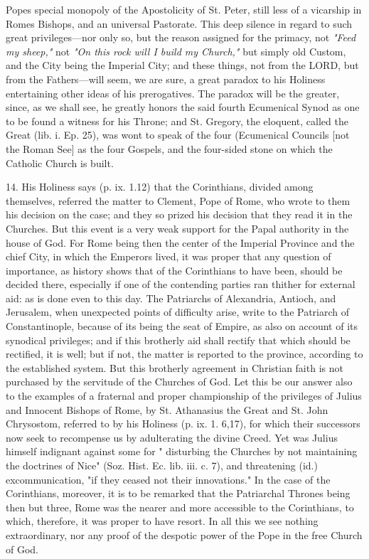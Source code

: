 Pope\textquotesingle s special monopoly of the Apostolicity of St.
Peter, still less of a vicarship in Rome\textquotesingle s Bishops, and
an universal Pastorate. This deep silence in regard to such great
privileges---nor only so, but the reason assigned for the primacy, not
\emph{"Feed my sheep,"} not \emph{"On this rock will I build my
Church,"} but simply old Custom, and the City being the Imperial City;
and these things, not from the LORD, but from the Fathers---will seem,
we are sure, a great paradox to his Holiness entertaining other ideas of
his prerogatives. The paradox will be the greater, since, as we shall
see, he greatly honors the said fourth Ecumenical Synod as one to be
found a witness for his Throne; and St. Gregory, the eloquent, called
the Great (lib. i. Ep. 25), was wont to speak of the four (Ecumenical
Councils {[}not the Roman See{]} as the four Gospels, and the four-sided
stone on which the Catholic Church is built.

14. His Holiness says (p. ix. 1.12) that the Corinthians, divided among
themselves, referred the matter to Clement, Pope of Rome, who wrote to
them his decision on the case; and they so prized his decision that they
read it in the Churches. But this event is a very weak support for the
Papal authority in the house of God. For Rome being then the center of
the Imperial Province and the chief City, in which the Emperors lived,
it was proper that any question of importance, as history shows that of
the Corinthians to have been, should be decided there, especially if one
of the contending parties ran thither for external aid: as is done even
to this day. The Patriarchs of Alexandria, Antioch, and Jerusalem, when
unexpected points of difficulty arise, write to the Patriarch of
Constantinople, because of its being the seat of Empire, as also on
account of its synodical privileges; and if this brotherly aid shall
rectify that which should be rectified, it is well; but if not, the
matter is reported to the province, according to the established system.
But this brotherly agreement in Christian faith is not purchased by the
servitude of the Churches of God. Let this be our answer also to the
examples of a fraternal and proper championship of the privileges of
Julius and Innocent Bishops of Rome, by St. Athanasius the Great and St.
John Chrysostom, referred to by his Holiness (p. ix. 1. 6,17), for which
their successors now seek to recompense us by adulterating the divine
Creed. Yet was Julius himself indignant against some for " disturbing
the Churches by not maintaining the doctrines of Nice" (Soz. Hist. Ec.
lib. iii. c. 7), and threatening (id.) excommunication, "if they ceased
not their innovations." In the case of the Corinthians, moreover, it is
to be remarked that the Patriarchal Thrones being then but three, Rome
was the nearer and more accessible to the Corinthians, to which,
therefore, it was proper to have resort. In all this we see nothing
extraordinary, nor any proof of the despotic power of the Pope in the
free Church of God.

